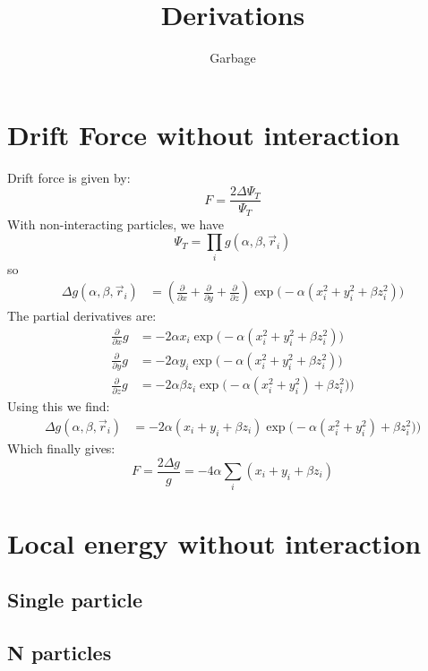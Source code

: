 \documentclass[12pt]{article}
\newcommand{\f}[2]{\frac{#1}{#2}}
\newcommand{\beq}{\begin{equation*}}
\newcommand{\eeq}{\end{equation*}}
\newcommand{\pp}[1]{\frac{\partial}{\partial #1}}
\begin{document}
\title{Derivations}
\author{Garbage}
\maketitle

\section*{Drift Force without interaction}

Drift force is given by:
\beq
F = \f{2\Delta\Psi_T}{\Psi_T}
\eeq
With non-interacting particles, we have
\beq
\Psi_T = \prod_{i} g(\alpha, \beta, \vec{r}_i)
\eeq
so
\begin{align*}
	\Delta g(\alpha, \beta, \vec{r}_i) &= 
	\left( \pp{x}+\pp{y}+\pp{z}\right)
	\exp\big(-\alpha(x^{2}_i + y^{2}_i + \beta z^{2}_i)\big)
\end{align*}
The partial derivatives are:
\begin{align*}
	\pp{x}g &= -2\alpha x_i \exp\big(-\alpha(x^{2}_i + y^{2}_i + \beta z^{2}_i)\big) \\
	\pp{y}g &= -2\alpha y_i \exp\big(-\alpha(x^{2}_i + y^{2}_i + \beta z^{2}_i)\big) \\
	\pp{z}g &= -2\alpha\beta z_i \exp\big(-\alpha(x^{2}_i + y^{2}_i) + \beta z^{2}_i)\big)
\end{align*}
Using this we find:
\begin{align*}
	\Delta g(\alpha, \beta, \vec{r}_i) &= 
	-2\alpha(x_i + y_i + \beta z_i)\exp\big(-\alpha(x^{2}_i + y^{2}_i) + \beta z^{2}_i)\big)
\end{align*}
Which finally gives:
\beq
	F = \f{2\Delta g}{g} = -4\alpha \sum_{i}(x_i + y_i + \beta z_i)
\eeq

\section{Local energy without interaction}
\subsection{Single particle}
\subsection{N particles}
\end{document}

